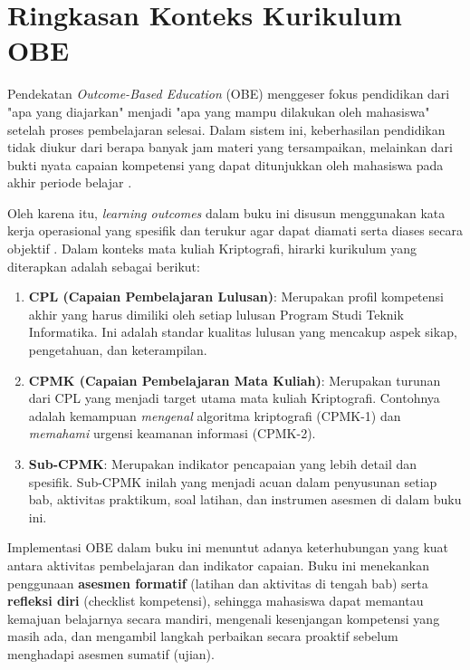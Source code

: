 \section{Ringkasan Konteks Kurikulum OBE}

Pendekatan \textit{Outcome-Based Education} (OBE) menggeser fokus pendidikan dari "apa yang diajarkan" menjadi "apa yang mampu dilakukan oleh mahasiswa" setelah proses pembelajaran selesai. Dalam sistem ini, keberhasilan pendidikan tidak diukur dari berapa banyak jam materi yang tersampaikan, melainkan dari bukti nyata capaian kompetensi yang dapat ditunjukkan oleh mahasiswa pada akhir periode belajar \cite{obe_wikipedia}.

Oleh karena itu, \textit{learning outcomes} dalam buku ini disusun menggunakan kata kerja operasional yang spesifik dan terukur agar dapat diamati serta diases secara objektif \cite{adelaide_learning_outcomes,stanford_learning_outcomes}. Dalam konteks mata kuliah Kriptografi, hirarki kurikulum yang diterapkan adalah sebagai berikut:

\begin{enumerate}
    \item \textbf{CPL (Capaian Pembelajaran Lulusan)}: Merupakan profil kompetensi akhir yang harus dimiliki oleh setiap lulusan Program Studi Teknik Informatika. Ini adalah standar kualitas lulusan yang mencakup aspek sikap, pengetahuan, dan keterampilan.
    \item \textbf{CPMK (Capaian Pembelajaran Mata Kuliah)}: Merupakan turunan dari CPL yang menjadi target utama mata kuliah Kriptografi. Contohnya adalah kemampuan \textit{mengenal} algoritma kriptografi (CPMK-1) dan \textit{memahami} urgensi keamanan informasi (CPMK-2).
    \item \textbf{Sub-CPMK}: Merupakan indikator pencapaian yang lebih detail dan spesifik. Sub-CPMK inilah yang menjadi acuan dalam penyusunan setiap bab, aktivitas praktikum, soal latihan, dan instrumen asesmen di dalam buku ini.
\end{enumerate}

Implementasi OBE dalam buku ini menuntut adanya keterhubungan yang kuat antara aktivitas pembelajaran dan indikator capaian. Buku ini menekankan penggunaan \textbf{asesmen formatif} (latihan dan aktivitas di tengah bab) serta \textbf{refleksi diri} (checklist kompetensi), sehingga mahasiswa dapat memantau kemajuan belajarnya secara mandiri, mengenali kesenjangan kompetensi yang masih ada, dan mengambil langkah perbaikan secara proaktif sebelum menghadapi asesmen sumatif (ujian).

